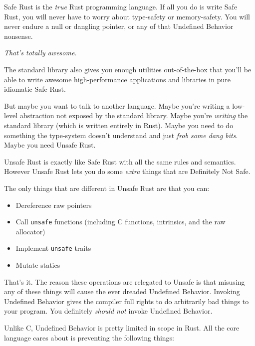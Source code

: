 \documentclass[a4paper,]{book}
\begin{document}
Safe Rust is the \emph{true} Rust programming language. If all you do is
write Safe Rust, you will never have to worry about type-safety or
memory-safety. You will never endure a null or dangling pointer, or any
of that Undefined Behavior nonsense.

\emph{That's totally awesome.}

The standard library also gives you enough utilities out-of-the-box that
you'll be able to write awesome high-performance applications and
libraries in pure idiomatic Safe Rust.

But maybe you want to talk to another language. Maybe you're writing a
low-level abstraction not exposed by the standard library. Maybe you're
\emph{writing} the standard library (which is written entirely in Rust).
Maybe you need to do something the type-system doesn't understand and
just \emph{frob some dang bits}. Maybe you need Unsafe Rust.

Unsafe Rust is exactly like Safe Rust with all the same rules and
semantics. However Unsafe Rust lets you do some \emph{extra} things that
are Definitely Not Safe.

The only things that are different in Unsafe Rust are that you can:

\begin{itemize}
\itemsep1pt\parskip0pt
\item
  Dereference raw pointers
\item
  Call \texttt{unsafe} functions (including C functions, intrinsics, and
  the raw allocator)
\item
  Implement \texttt{unsafe} traits
\item
  Mutate statics
\end{itemize}

That's it. The reason these operations are relegated to Unsafe is that
misusing any of these things will cause the ever dreaded Undefined
Behavior. Invoking Undefined Behavior gives the compiler full rights to
do arbitrarily bad things to your program. You definitely \emph{should
not} invoke Undefined Behavior.

Unlike C, Undefined Behavior is pretty limited in scope in Rust. All the
core language cares about is preventing the following things:
\end{document}
